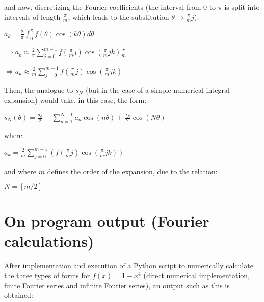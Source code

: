 \documentclass[paper=a4, fontsize=11pt]{scrartcl} %
\numberwithin{equation}{section} %
\numberwithin{figure}{section} %
\numberwithin{table}{section} %
\begin{document}
and now, discretizing the Fourier coefficients (the interval from $0$ to $\pi$ is split into intervals of length $\frac{\pi}{m}$, which leads to the substitution $\theta\rightarrow \frac{\pi}{m}j$):



\begin{center}
$a_{k} = \frac{2}{\pi}\int_{0}^{\pi}f(\theta)\cos(k\theta)d\theta$
\end{center}

\begin{center}
$\Rightarrow a_{k} \approx \frac{2}{\pi}\sum_{j=0}^{m-1}f\left(\frac{\pi}{m}j\right)\cos\left(\frac{\pi}{m}jk\right)\frac{\pi}{m}$
\end{center}

\begin{center}
$\Rightarrow a_{k} \approx \frac{2}{m}\sum_{j=0}^{m-1}f\left(\frac{\pi}{m}j\right)\cos\left(\frac{\pi}{m}jk\right)$
\end{center}


Then, the analogue to $s_{N}$ (but in the case of a simple numerical integral expansion) would take, in this case, the form:

\begin{center}
$s_{N}(\theta) = \frac{a_{0}}{2}+\sum_{n=1}^{N-1}a_{n}\cos(n\theta)+\frac{a_{N}}{2}\cos(N\theta)$
\end{center}

where:

\begin{center}
$a_{k} = \frac{2}{m}\sum_{j=0}^{m-1}\left(f\left(\frac{\pi}{m}j\right)\cos\left(\frac{\pi}{m}jk\right)\right)$
\end{center}

and where $m$ defines the order of the expansion, due to the relation:

\begin{center}
$N=[m/2]$
\end{center}



\section{On program output (Fourier calculations)}


After implementation and execution of a Python script to numerically calculate the three types of forms for $f(x) = 1-x^{4}$ (direct numerical implementation, finite Fourier series and infinite Fourier series), an output such as this is obtained:
\end{document}
